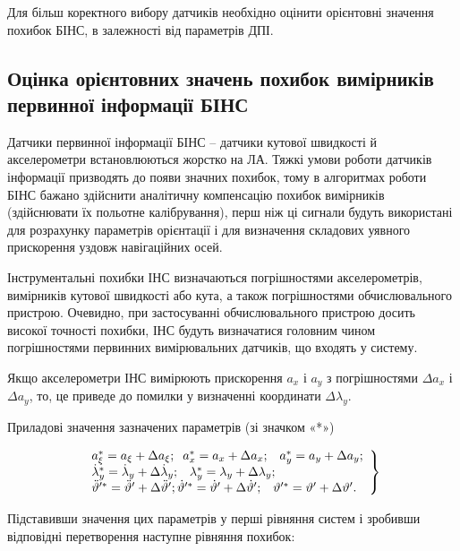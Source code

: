 Для більш коректного вибору датчиків необхідно оцінити орієнтовні значення похибок БІНС, в залежності від параметрів ДПІ.

\subsection{Оцінка орієнтовних значень похибок вимірників первинної інформації БІНС}

Датчики первинної інформації БІНС -- датчики кутової швидкості й акселерометри встановлюються жорстко на ЛА. Тяжкі умови роботи датчиків інформації призводять до появи значних похибок, тому в алгоритмах роботи БІНС бажано здійснити аналітичну компенсацію похибок вимірників (здійснювати їх польотне калібрування), перш ніж ці сигнали будуть використані для розрахунку параметрів орієнтації і для визначення складових уявного прискорення уздовж навігаційних осей.

Інструментальні похибки ІНС визначаються погрішностями акселерометрів, вимірників кутової швидкості або кута, а також погрішностями обчислювального пристрою. Очевидно, при застосуванні обчислювального пристрою досить високої точності похибки, ІНС будуть визначатися головним чином погрішностями первинних вимірювальних датчиків, що входять у систему.

Якщо акселерометри ІНС вимірюють прискорення $a_{x} $ і $a_{y} $ з погрішностями $\Delta a_{x} $ і $\Delta a_{y} $, то,  це приведе до помилки у визначенні координати $\Delta \lambda _{y} $.

Приладові значення зазначених параметрів (зі значком «*»)

\begin{equation} 
\label{eq:err} 
\left. 
\begin{array}{l} 
{a_{\xi }^{*} =a_{\xi } +\Delta a_{\xi } ;{\rm \; \; }a_{x}^{*} =a_{x} +\Delta a_{x} ;
{\rm \; \; \; }a_{y}^{*} =a_{y} +\Delta a_{y} ;} 
\\ {\dot{\lambda }_{y}^{*} =\dot{\lambda }_{y} +\Delta \dot{\lambda }_{y} ;{\rm \; \; \; }\lambda _{y}^{*} =\lambda _{y} 
+\Delta \lambda _{y} ;}
\\ {\ddot{\vartheta }'^{*} =\ddot{\vartheta }'+\Delta \ddot{\vartheta }'; \dot{\vartheta }'^{*} =\dot{\vartheta }'+\Delta \dot{\vartheta }';
{\rm \; \; \; }\vartheta '^{*} =\vartheta '+\Delta \vartheta '.} \end{array}\right\} 
\end{equation} 

Підставивши значення цих параметрів у перші рівняння систем і зробивши відповідні перетворення наступне рівняння похибок:

